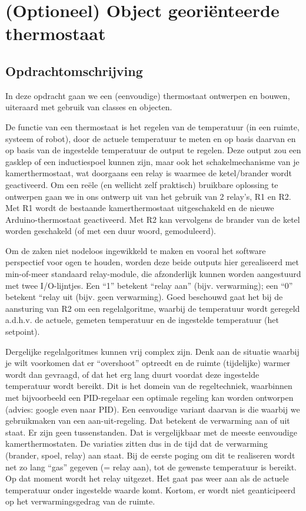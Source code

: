 \chapter{(Optioneel) Object georiënteerde thermostaat}

\section{Opdrachtomschrijving}

In deze opdracht gaan we een (eenvoudige) thermostaat ontwerpen en bouwen, uiteraard met gebruik van classes en objecten. \par
De functie van een thermostaat is het regelen van de temperatuur (in een ruimte, systeem of robot), door de actuele temperatuur te meten en op basis daarvan en op basis van de ingestelde temperatuur de output te regelen. Deze output zou een gasklep of een inductiespoel kunnen zijn, maar ook het schakelmechanisme van je kamerthermostaat, wat doorgaans een relay is waarmee de ketel/brander wordt geactiveerd. Om een reële (en wellicht zelf praktisch) bruikbare oplossing te ontwerpen gaan we in ons ontwerp uit van het gebruik van 2 relay’s, R1 en R2. Met R1 wordt de bestaande kamerthermostaat uitgeschakeld en de nieuwe Arduino-thermostaat geactiveerd. Met R2 kan vervolgens de brander van de ketel worden geschakeld (of met een duur woord, gemoduleerd). \par

Om de zaken niet nodeloos ingewikkeld te maken en vooral het software perspectief voor ogen te houden, worden deze beide outputs hier gerealiseerd met min-of-meer standaard relay-module, die afzonderlijk kunnen worden aangestuurd met twee I/O-lijntjes. Een “1” betekent “relay aan” (bijv. verwarming); een “0” betekent “relay uit (bijv. geen verwarming). Goed beschouwd gaat het bij de aansturing van R2 om een regelalgoritme, waarbij de temperatuur wordt geregeld a.d.h.v. de actuele, gemeten temperatuur en de ingestelde temperatuur (het setpoint).\par
Dergelijke regelalgoritmes kunnen vrij complex zijn. Denk aan de situatie waarbij je wilt voorkomen dat er “overshoot” optreedt en de ruimte (tijdelijke) warmer wordt dan gevraagd, of dat het erg lang duurt voordat deze ingestelde temperatuur wordt bereikt. Dit is het domein van de regeltechniek, waarbinnen met bijvoorbeeld een PID-regelaar een optimale regeling kan worden ontworpen (advies: google even naar PID). Een eenvoudige variant daarvan is die waarbij we gebruikmaken van een aan-uit-regeling. Dat betekent de verwarming aan of uit staat. Er zijn geen tussenstanden. Dat is vergelijkbaar met de meeste eenvoudige kamerthermostaten. De variaties zitten dus in de tijd dat de verwarming (brander, spoel, relay) aan staat. Bij de eerste poging om dit te realiseren wordt net zo lang “gas” gegeven (= relay aan), tot de gewenste temperatuur is bereikt. Op dat moment wordt het relay uitgezet. Het gaat pas weer aan als de actuele temperatuur onder ingestelde waarde komt. Kortom, er wordt niet geanticipeerd op het verwarmingsgedrag van de ruimte.

